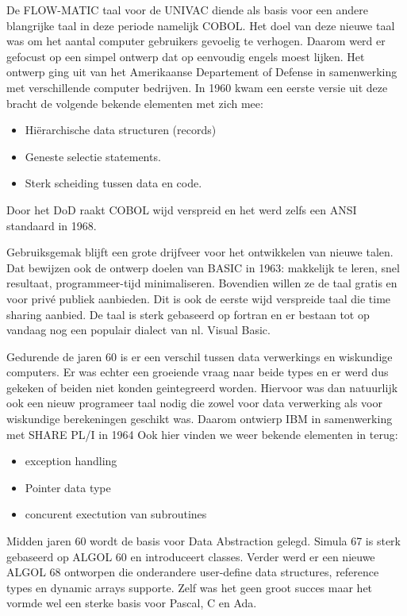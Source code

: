 \documentclass[../main.tex]{subfiles}
\begin{document}
\begin{solution}
De FLOW-MATIC taal voor de UNIVAC diende als basis voor een andere blangrijke taal in deze periode namelijk COBOL.
Het doel van deze nieuwe taal was om het aantal computer gebruikers gevoelig te verhogen. 
Daarom werd er gefocust op een simpel ontwerp dat op eenvoudig engels moest lijken.
Het ontwerp ging uit van het Amerikaanse Departement of Defense in samenwerking met verschillende computer bedrijven.
In 1960 kwam een eerste versie uit deze bracht de volgende bekende elementen met zich mee:
\begin{itemize}
		\item Hi\"erarchische data structuren (records)
		\item Geneste selectie statements.
		\item Sterk scheiding tussen data en code.
\end{itemize}
Door het DoD raakt COBOL wijd verspreid en het werd zelfs een ANSI standaard in 1968.

Gebruiksgemak blijft een grote drijfveer voor het ontwikkelen van nieuwe talen.
Dat bewijzen ook de ontwerp doelen van BASIC in 1963: makkelijk te leren, snel resultaat, programmeer-tijd minimaliseren.
Bovendien willen ze de taal gratis en voor priv\'e publiek aanbieden. 
Dit is ook de eerste wijd verspreide taal die time sharing aanbied.
De taal is sterk gebaseerd op fortran en er bestaan tot op vandaag nog een populair dialect van nl. Visual Basic.

Gedurende de jaren 60 is er een verschil tussen data verwerkings en wiskundige computers. 
Er was echter een groeiende vraag naar beide types en er werd dus gekeken of beiden niet konden geintegreerd worden.
Hiervoor was dan natuurlijk ook een nieuw programeer taal nodig die zowel voor data verwerking als voor wiskundige berekeningen geschikt was.
Daarom ontwierp IBM in samenwerking met SHARE PL/I in 1964
Ook hier vinden we weer bekende elementen in terug:
\begin{itemize}
	\item exception handling
	\item Pointer data type 
	\item concurent exectution van subroutines 
\end{itemize}

Midden jaren 60 wordt de basis voor Data Abstraction gelegd.
Simula 67 is sterk gebaseerd op ALGOL 60 en introduceert classes.
Verder werd er een nieuwe ALGOL 68 ontworpen die onderandere user-define data structures, reference types en dynamic arrays supporte.
Zelf was het geen groot succes maar het vormde wel een sterke basis voor Pascal, C en Ada.


\end{solution}
\end{document}
